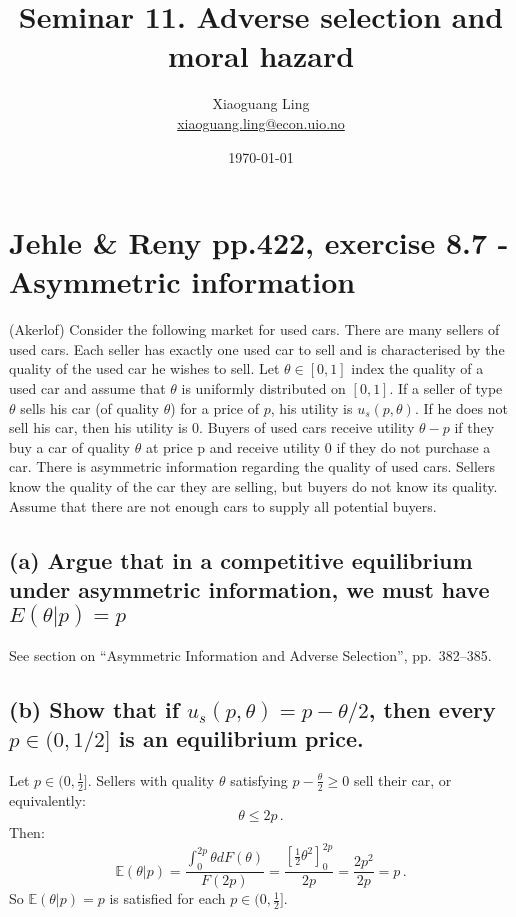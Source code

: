 \documentclass{article}
\title{Seminar 11. Adverse selection and moral hazard}
\author{Xiaoguang Ling \\  \href{xiaoguang.ling@econ.uio.no}{xiaoguang.ling@econ.uio.no}}
\date{\today}
\begin{document}
\maketitle


\section{Jehle \& Reny pp.422, exercise 8.7 - Asymmetric information}

(Akerlof) Consider the following market for used cars. There are many sellers of used cars. Each
seller has exactly one used car to sell and is characterised by the quality of the used car he wishes to
sell. Let $\theta \in [0, 1]$ index the quality of a used car and assume that $\theta$ is uniformly distributed on $[0, 1]$.
If a seller of type $\theta$ sells his car (of quality $\theta$) for a price of $p$, his utility is $u_s(p, \theta)$. If he does not sell
his car, then his utility is 0. Buyers of used cars receive utility $\theta - p$ if they buy a car of quality $\theta$ at
price p and receive utility 0 if they do not purchase a car. There is asymmetric information regarding
the quality of used cars. Sellers know the quality of the car they are selling, but buyers do not know
its quality. Assume that there are not enough cars to supply all potential buyers.


\subsection*{(a) Argue that in a competitive equilibrium under asymmetric information, we must have
$E(\theta | p) = p$}


See section on ``Asymmetric Information and Adverse Selection'', pp.~382--385.


\subsection*{(b) Show that if $u_s(p, \theta) = p - \theta/2$, then every $p \in (0, 1/2]$ is an equilibrium price.}

Let $p \in (0,\tfrac12]$. Sellers with quality $\theta$ satisfying $p - \tfrac{\theta}2 \geq 0$ sell their car, or equivalently:$$\theta \leq 2p \, .$$
Then:
$$\mathbb{E}(\theta | p) = \frac{\int_{0}^{2p}\theta dF(\theta)}{F(2p)} = \frac{\left[ \tfrac12 \theta^2 \right]^{2p}_0}{2p} = \frac{2p^2}{2p} = p \, .$$
So $\mathbb{E}(\theta | p) = p$ is satisfied for each $p \in (0,\tfrac12]$.
\end{document}
